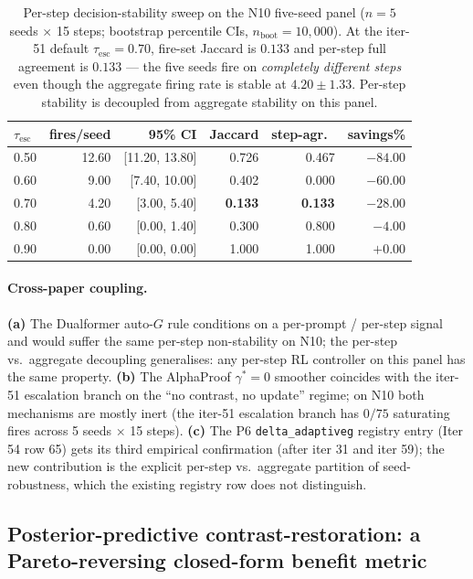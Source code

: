 \documentclass{article}
\begin{document}
\begin{table}[t]
\centering
\caption{Per-step decision-stability sweep on the N10 five-seed
panel ($n{=}5$ seeds $\times$ 15 steps; bootstrap percentile CIs,
$n_{\text{boot}}{=}10{,}000$).  At the iter-51 default
$\tau_{\mathrm{esc}}{=}0.70$, fire-set Jaccard is $0.133$ and
per-step full agreement is $0.133$ --- the five seeds fire on
\emph{completely different steps} even though the aggregate
firing rate is stable at $4.20 \pm 1.33$.  Per-step stability
is decoupled from aggregate stability on this panel.}
\label{tab:p7-tau-decision-stability}
\begin{tabular}{lrrrrr}
\toprule
$\tau_{\mathrm{esc}}$ & fires/seed & 95\% CI & Jaccard & step-agr.\ & savings\% \\
\midrule
0.50 & 12.60 & [11.20, 13.80] & 0.726 & 0.467 & $-84.00$ \\
0.60 &  9.00 &  [7.40, 10.00] & 0.402 & 0.000 & $-60.00$ \\
0.70 &  4.20 &  [3.00,  5.40] & \textbf{0.133} & \textbf{0.133} & $-28.00$ \\
0.80 &  0.60 &  [0.00,  1.40] & 0.300 & 0.800 &  $-4.00$ \\
0.90 &  0.00 &  [0.00,  0.00] & 1.000 & 1.000 &  $+0.00$ \\
\bottomrule
\end{tabular}
\end{table}

\paragraph{Cross-paper coupling.}
\textbf{(a)} The Dualformer auto-$G$ rule
\citep{su2024dualformer} conditions on a per-prompt /
per-step signal and would suffer the same per-step
non-stability on N10; the per-step vs.\ aggregate
decoupling generalises: any per-step RL controller on
this panel has the same property.  \textbf{(b)} The
AlphaProof $\gamma^*{=}0$ smoother \citep{alphaproof2025nature}
coincides with the iter-51 escalation branch on the
``no contrast, no update'' regime; on N10 both
mechanisms are mostly inert (the iter-51 escalation
branch has $0/75$ saturating fires across 5 seeds
$\times$ 15 steps).  \textbf{(c)} The P6
\texttt{delta\_adaptiveg} registry entry
(Iter 54 row 65) gets its third empirical
confirmation (after iter 31 and iter 59); the new
contribution is the explicit per-step vs.\ aggregate
partition of seed-robustness, which the existing
registry row does not distinguish.

\subsection{Posterior-predictive contrast-restoration: a Pareto-reversing
closed-form benefit metric}
\label{sec:p7-postpred}
\end{document}
